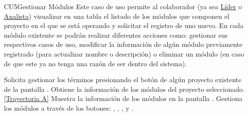 	\begin{UseCase}{CU5}{Gestionar Módulos}{
	Este caso de uso permite al colaborador (ya sea \hyperlink{jefe}{Líder} o \hyperlink{analista}{Analista}) visualizar en una tabla el listado de los módulos que componen el proyecto en el que se está operando y solicitar el registro de uno nuevo. En cada módulo existente se podrán realizar diferentes acciones como: gestionar sus respectivos casos de uso, modificar la información de algún módulo previamente registrado (para actualizar nombre o descripción) o eliminar un módulo (en caso de que este ya no tenga una razón de ser dentro del sistema).\\
	}
\end{UseCase}
\begin{UCtrayectoria}
	\UCpaso[\UCactor] Solicita gestionar los términos presionando el botón  de algún proyecto existente de la pantalla .
	\UCpaso[\UCsist] Obtiene la información de los módulos del proyecto seleccionado. \hyperlink{CU5:TAA}{[Trayectoria A]}
	\UCpaso[\UCsist] Muestra la información de los módulos en la pantalla .\label{CU5-P3}
	\UCpaso[\UCactor] Gestiona los módulos a través de los botones: , \editar, \eliminar, \UCsist  y .
\end{UCtrayectoria}		
